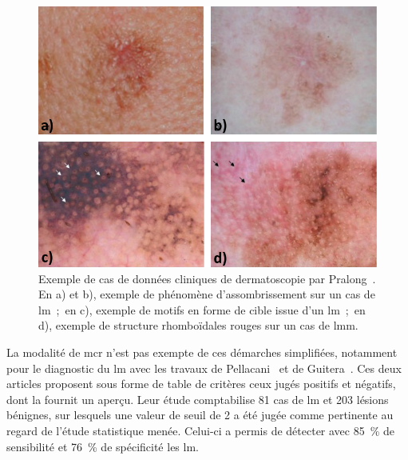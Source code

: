 \begin{figure}[H]
    \begin{center}
        \includegraphics[width=\linewidth]{contents/chapter_4/resources/example_dermoscopy_pattern.pdf}
        \caption{Exemple de cas de données cliniques de dermatoscopie par Pralong~. En a) et b), exemple de phénomène d'assombrissement sur un cas de \gls{lm}~;~en c), exemple de motifs en forme de cible issue d'un \gls{lm}~;~en d), exemple de structure rhomboïdales rouges sur un cas de \gls{lmm}.}
        \label{fig:example_dermoscopy_pattern}
    \end{center} 
\end{figure}\par

La modalité de \gls{mcr} n'est pas exempte de ces démarches simplifiées, notamment pour le diagnostic du \gls{lm} avec les travaux de Pellacani~ et de Guitera~. Ces deux articles proposent sous forme de table de critères ceux jugés positifs et négatifs, dont la  fournit un aperçu. Leur étude comptabilise 81 cas de \gls{lm} et 203 lésions bénignes, sur lesquels une valeur de seuil de 2 a été jugée comme pertinente au regard de l'étude statistique menée. Celui-ci a permis de détecter avec 85~\% de sensibilité et 76~\% de spécificité les \gls{lm}.\par


